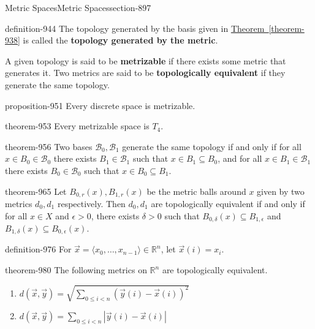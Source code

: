 \documentclass[oneside,10pt,]{article}
\newcommand{\terminology}[1]{\textbf{#1}}
\newcommand{\tuple}[1]{\langle #1 \rangle}
\newcommand{\mb}{\mathbb}
\newcommand{\mc}{\mathcal}
\newcommand{\lt}{<}
\newcommand{\gt}{>}
\begin{document}
\begin{sectionptx}{Metric Spaces}{}{Metric Spaces}{}{}{section-897}
\begin{definition}{}{definition-944}%
\hypertarget{p-945}{}%
The topology generated by the basis given in \hyperref[theorem-938]{Theorem~\ref{theorem-938}} is called the \terminology{topology generated by the metric}.%
\par
\hypertarget{p-948}{}%
A given topology is said to be \terminology{metrizable} if there exists some metric that generates it. Two metrics are said to be \terminology{topologically equivalent} if they generate the same topology.%
\end{definition}
\begin{proposition}{}{}{proposition-951}%
\hypertarget{p-952}{}%
Every discrete space is metrizable.%
\end{proposition}
\begin{theorem}{}{}{theorem-953}%
\hypertarget{p-954}{}%
Every metrizable space is \(T_4\).%
\end{theorem}
\begin{theorem}{}{}{theorem-956}%
\hypertarget{p-957}{}%
Two bases \(\mc B_0,\mc B_1\) generate the same topology if and only if for all \(x\in B_0\in\mc B_0\) there exists \(B_1\in\mc B_1\) such that \(x\in B_1\subseteq B_0\), and for all \(x\in B_1\in\mc B_1\) there exists \(B_0\in\mc B_0\) such that \(x\in B_0\subseteq B_1\). %
\end{theorem}
\begin{theorem}{}{}{theorem-965}%
\hypertarget{p-966}{}%
Let \(B_{0,r}(x),B_{1,r}(x)\) be the metric balls around \(x\) given by two metrics \(d_0,d_1\) respectively. Then \(d_0,d_1\) are topologically equivalent if and only if for all \(x\in X\) and \(\epsilon\gt 0\), there exists \(\delta\gt 0\) such that \(B_{0,\delta}(x)\subseteq B_{1,\epsilon}\) and \(B_{1,\delta}(x)\subseteq B_{0,\epsilon}(x)\).%
\end{theorem}
\begin{definition}{}{definition-976}%
\hypertarget{p-977}{}%
For \(\vec x=\tuple{x_0,\dots,x_{n-1}}\in\mb R^n\), let \(\vec x(i)=x_i\).%
\end{definition}
\begin{theorem}{}{}{theorem-980}%
\hypertarget{p-981}{}%
The following metrics on \(\mb R^n\) are topologically equivalent.%
\leavevmode%
\begin{enumerate}
\item\hypertarget{li-984}{}\(d(\vec x,\vec y)=\sqrt{\sum_{0\leq i\lt n}(\vec y(i)-\vec x(i))^2}\)%
\item\hypertarget{li-986}{}\(d(\vec x,\vec y)=\sum_{0\leq i\lt n}|\vec y(i)-\vec x(i)|\)%

\end{enumerate}
\end{theorem}
\end{sectionptx}
\end{document}
